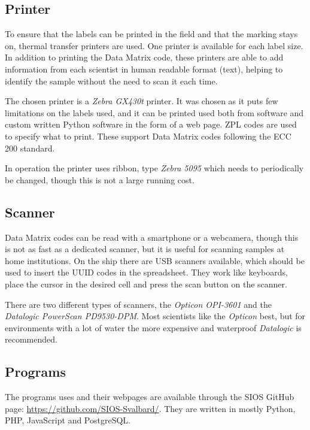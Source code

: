 \documentclass[a4paper,english, 11pt]{article}
\begin{document}

\subsection{Printer} %
\label{sub:Printer}
To ensure that the labels can be printed in the field and that the marking stays on, thermal transfer printers are used. One printer is available for each label size. In addition to printing the Data Matrix code, these printers are able to add information from each scientist in human readable format (text), helping to identify the sample without the need to scan it each time.

The chosen printer is a \emph{Zebra GX430t} printer. It was chosen as it puts few limitations on the labels used, and it can be printed used both from software and custom written Python software in the form of a web page. ZPL codes are used to specify what to print. These support Data Matrix codes following the ECC 200 standard.


In operation the printer uses ribbon, type \emph{Zebra 5095} which needs to periodically be changed, though this is not a large running cost.

\subsection{Scanner} %
\label{sub:Scanner}

Data Matrix codes can be read with a smartphone or a webcamera, though this is not as fast as a dedicated scanner, but it is useful for scanning samples at home institutions. On the ship there are USB scanners available, which should be used to insert the UUID codes in the spreadsheet. They work like keyboards, place the cursor in the desired cell and press the scan button on the scanner.

There are two different types of scanners, the \emph{Opticon OPI-3601} and the \emph{Datalogic PowerScan PD9530-DPM}. Most scientists like the \emph{Opticon} best, but for environments with a lot of water the more expensive and waterproof \emph{Datalogic} is recommended.

\subsection{Programs} %
\label{sub:Programs}
The programs uses and their webpages are available through the SIOS GitHub page: \url{https://github.com/SIOS-Svalbard/}. They are written in mostly Python, PHP, JavaScript and PostgreSQL.
\end{document}
